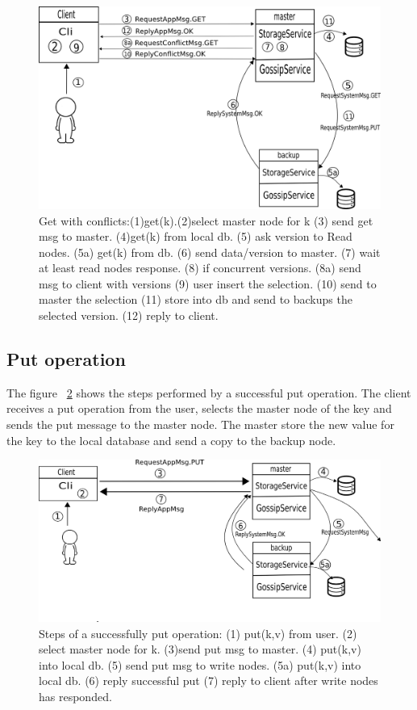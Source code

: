 \begin{•}
\begin{figure}[H]
\centering
\includegraphics[scale=0.5]{figures/getConflict.png}
\caption{Get with conflicts:(1)get(k).(2)select master node for k (3) send get msg to master. (4)get(k) from local db. (5) ask version to Read nodes. (5a) get(k) from db. (6) send data/version to master. (7) wait at least read nodes response. (8) if concurrent versions. (8a) send msg to client with versions (9) user insert the selection. (10) send to master the selection (11) store into db and send to backups the selected version. (12) reply to client.}
\label{fig:getConflict}
\end{figure}

\subsection*{Put operation}

The figure ~\ref{fig:put} shows the steps performed by a successful put operation.
The client receives a put operation from the user, selects the master node of the key and sends the put message to the master node. The master store the new value for the key to the local database and send a copy to the backup node.

\begin{figure}[H]
\centering
\includegraphics[scale=0.5]{figures/put.png}
\caption{Steps of a successfully put operation: (1) put(k,v) from user. (2) select master node for k. (3)send put msg to master. (4) put(k,v) into local db. (5) send put msg to write nodes. (5a) put(k,v) into local db. (6) reply successful put (7) reply to client after write nodes has responded. }
\label{fig:put}
\end{figure}


\end{•}
